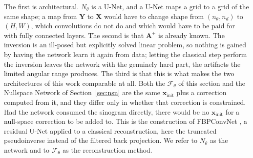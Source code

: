 \documentclass{article}
\numberwithin{equation}{section}
\begin{document}
The first is architectural. $N_\theta$ is a U-Net, and a U-Net maps a grid to a grid of the same shape; a map from
$\mathbf{Y}$ to $\mathbf{X}$ would have to change shape from $(n_\theta,n_d)$ to $(H,W)$, which convolutions do not
do and which would have to be paid for with fully connected layers.
The second is that $\mathbf{A}^{+}$ is already known. The inversion is an ill-posed but explicitly solved linear
problem, so nothing is gained by having the network learn it again from data; letting the classical step perform the
inversion leaves the network with the genuinely hard part, the artifacts the limited angular range produces.
The third is that this is what makes the two architectures of this work comparable at all. Both the
$\mathcal{F}_\theta$ of this section and the Nullspace Network of Section~\ref{sec:nsn} are the same
$\mathbf{x}_\text{init}$ plus a correction computed from it, and they differ only in whether that correction is
constrained. Had the network consumed the sinogram directly, there would be no $\mathbf{x}_\text{init}$ for a
null-space correction to be added to.
This is the construction of FBPConvNet \parencite{jin2017fbpconvnet}, a residual U-Net applied to
a classical reconstruction, here the truncated pseudoinverse instead of the filtered back projection.
We refer to $N_\theta$ as the network and to $\mathcal{F}_\theta$ as the reconstruction
method.\\
\end{document}
